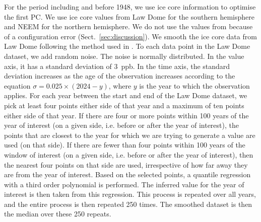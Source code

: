 For the period including and before 1948, we use ice core information to optimise the first PC.
We use ice core values from Law Dome \citep{rubino_law-dome-dataset_2019} for the southern hemisphere
and NEEM \citep{rhodes-brook_neem-ch4-dataset_2019,rhodes_neem-ch4_2013} for the northern hemisphere.
We do not use the values from \citet{menking_law-dome_2025} because of a configuration error
(Sect.~\ref{sec:discussion}).
We smooth the ice core data from Law Dome following the method used in \citet{meinshausen_historical-ghgs_2017}.
To each data point in the Law Dome dataset,
we add random noise.
The noise is normally distributed.
In the value axis, it has a standard deviation of 3~ppb.
In the time axis, the standard deviation increases as the age of the observation increases
according to the equation $\sigma = 0.025 \times (2024 - y)$, where $y$ is the year to which the observation applies.
For each year between the start and end of the Law Dome dataset,
we pick at least four points either side of that year and a maximum of ten points either side of that year.
If there are four or more points within 100 years of the year of interest
(on a given side, i.e. before or after the year of interest),
the points that are closest to the year for which we are trying to generate a value are used (on that side).
If there are fewer than four points within 100 years of the window of interest
(on a given side, i.e. before or after the year of interest),
then the nearest four points on that side are used, irrespective of how far away they are from the year of interest.
Based on the selected points, a quantile regression with a third order polynomial is performed.
The inferred value for the year of interest is then taken from this regression.
This process is repeated over all years, and the entire process is then repeated 250 times.
The smoothed dataset is then the median over these 250 repeats.

